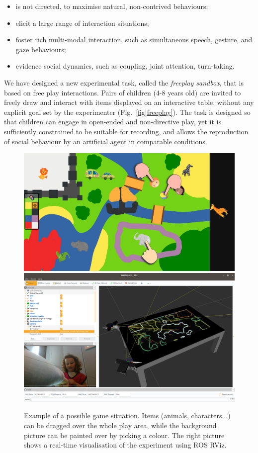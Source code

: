 \documentclass{article}
\begin{document}
\begin{itemize}
    \item is not directed, to maximise natural, non-contrived behaviours;
    \item elicit a large range of interaction situations;
    \item foster rich multi-modal interaction, such as simultaneous speech, gesture, and gaze
        behaviours;
    \item evidence social dynamics, such as coupling, joint attention, turn-taking.
\end{itemize}

We have designed a new experimental task, called the \emph{freeplay sandbox}, that is based on 
free play interactions. Pairs of children (4-8 years old) are invited to freely draw and interact with items
displayed on an interactive table, without any explicit goal set by the experimenter (Fig.~\ref{fig|freeplay}).
The task is designed so that children can engage in open-ended and non-directive play, yet it is
sufficiently constrained to be suitable for recording, and allows the reproduction of social behaviour by an artificial agent in comparable conditions.

\begin{figure}[ht!]
    \centering
    \includegraphics[width=0.52\linewidth]{sandbox}
    \hspace{0.2em}
    \includegraphics[width=0.46\linewidth]{rviz-sandtray}
    \caption{Example of a possible game situation. Items (animals,
    characters...) can be dragged over the whole play area, while the background
    picture can be painted over by picking a colour. The right picture shows a
    real-time visualisation of the experiment using ROS RViz.}

    \label{fig|sandbox}
\end{figure}
\end{document}
